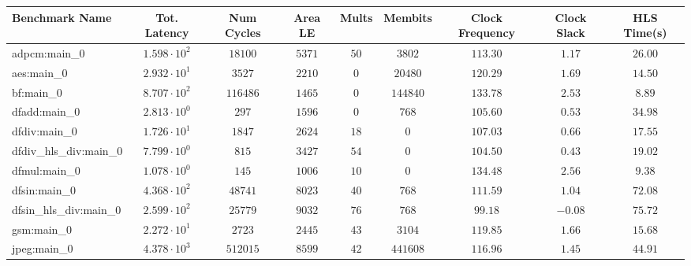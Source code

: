 \begin{tabular}{|l|c|c|c|c|c|c|c|c|}
\hline
Benchmark Name          & Tot. Latency           & Num Cycles & Area LE   & Mults   & Membits    & Clock Frequency & Clock Slack & HLS Time(s) \\
\hline
adpcm:main\_0           & $ 1.598 \cdot 10^{2} $ & $ 18100  $ & $ 5371  $ & $ 50  $ & $ 3802   $ & $ 113.30      $ & $ 1.17    $ & $ 26.00   $ \\
aes:main\_0             & $ 2.932 \cdot 10^{1} $ & $ 3527   $ & $ 2210  $ & $ 0   $ & $ 20480  $ & $ 120.29      $ & $ 1.69    $ & $ 14.50   $ \\
bf:main\_0              & $ 8.707 \cdot 10^{2} $ & $ 116486 $ & $ 1465  $ & $ 0   $ & $ 144840 $ & $ 133.78      $ & $ 2.53    $ & $ 8.89    $ \\
dfadd:main\_0           & $ 2.813 \cdot 10^{0} $ & $ 297    $ & $ 1596  $ & $ 0   $ & $ 768    $ & $ 105.60      $ & $ 0.53    $ & $ 34.98   $ \\
dfdiv:main\_0           & $ 1.726 \cdot 10^{1} $ & $ 1847   $ & $ 2624  $ & $ 18  $ & $ 0      $ & $ 107.03      $ & $ 0.66    $ & $ 17.55   $ \\
dfdiv\_hls\_div:main\_0 & $ 7.799 \cdot 10^{0} $ & $ 815    $ & $ 3427  $ & $ 54  $ & $ 0      $ & $ 104.50      $ & $ 0.43    $ & $ 19.02   $ \\
dfmul:main\_0           & $ 1.078 \cdot 10^{0} $ & $ 145    $ & $ 1006  $ & $ 10  $ & $ 0      $ & $ 134.48      $ & $ 2.56    $ & $ 9.38    $ \\
dfsin:main\_0           & $ 4.368 \cdot 10^{2} $ & $ 48741  $ & $ 8023  $ & $ 40  $ & $ 768    $ & $ 111.59      $ & $ 1.04    $ & $ 72.08   $ \\
dfsin\_hls\_div:main\_0 & $ 2.599 \cdot 10^{2} $ & $ 25779  $ & $ 9032  $ & $ 76  $ & $ 768    $ & $ 99.18       $ & $ -0.08   $ & $ 75.72   $ \\
gsm:main\_0             & $ 2.272 \cdot 10^{1} $ & $ 2723   $ & $ 2445  $ & $ 43  $ & $ 3104   $ & $ 119.85      $ & $ 1.66    $ & $ 15.68   $ \\
jpeg:main\_0            & $ 4.378 \cdot 10^{3} $ & $ 512015 $ & $ 8599  $ & $ 42  $ & $ 441608 $ & $ 116.96      $ & $ 1.45    $ & $ 44.91   $ \\

\end{tabular}
